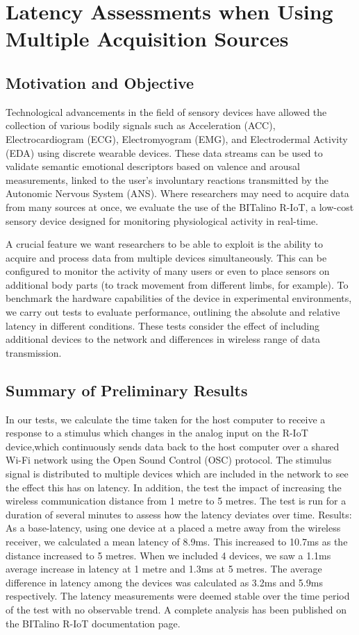 \section{Latency Assessments when Using Multiple Acquisition Sources}

\subsection{Motivation and Objective}

Technological advancements in the field of sensory devices have allowed the collection of various bodily signals such as Acceleration (ACC), Electrocardiogram (ECG), Electromyogram (EMG), and Electrodermal Activity (EDA) using discrete wearable devices. These data streams can be used to validate semantic emotional descriptors based on valence and arousal measurements, linked to the user’s involuntary reactions transmitted by the Autonomic Nervous System (ANS). Where researchers may need to acquire data from many sources at once, we evaluate the use of the BITalino R-IoT, a low-cost sensory device designed for monitoring physiological activity in real-time.

A crucial feature we want researchers to be able to exploit is the ability to acquire and process data from multiple devices simultaneously. This can be configured to monitor the activity of many users or even to place sensors on additional body parts (to track movement from different limbs, for example). To benchmark the hardware capabilities of the device in experimental environments, we carry out tests to evaluate performance, outlining the absolute and relative latency in different conditions. These tests consider the effect of including additional devices to the network and differences in wireless range of data transmission.

\subsection{Summary of Preliminary Results}

In our tests, we calculate the time taken for the host computer to receive a response to a stimulus which changes in the analog input on the R-IoT device,which continuously sends data back to the host computer over a shared Wi-Fi network using the Open Sound Control (OSC) protocol. The stimulus signal is distributed to multiple devices which are included in the network to see the effect this has on latency. In addition, the test the impact of increasing the wireless communication distance from 1 metre to 5 metres. The test is run for a duration of several minutes to assess how the latency deviates over time.
Results: As a base-latency, using one device at a placed a metre away from the wireless receiver, we calculated a mean latency of 8.9ms. This increased to 10.7ms as the distance increased to 5 metres. When we included 4 devices, we saw a 1.1ms average increase in latency at 1 metre and 1.3ms at 5 metres. The average difference in latency among the devices was calculated as 3.2ms and 5.9ms respectively. The latency measurements were deemed stable over the time period of the test with no observable trend. A complete analysis has been published on the BITalino R-IoT documentation page.

